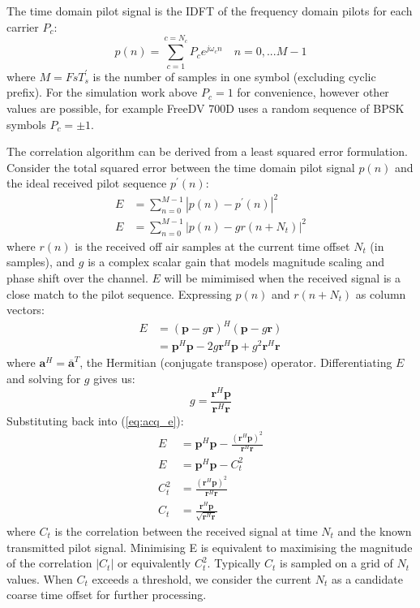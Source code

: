 \documentclass{article}
\begin{document}
The time domain pilot signal is the IDFT of the frequency domain pilots for each carrier $P_c$:
\begin{equation}
\label{eq:pilot_time}
p(n) = \sum^{c=N_c}_{c=1} P_c e^{j \omega_c n } \quad n=0,...M-1
\end{equation}
where $M=FsT^\prime_s$ is the number of samples in one symbol (excluding cyclic prefix). For the simulation work above $P_c=1$ for convenience, however other values are possible, for example FreeDV 700D uses a random sequence of BPSK symbols $P_c= \pm 1$.

The correlation algorithm can be derived from a least squared error formulation.  Consider the total squared error between the time domain pilot signal $p(n)$ and the ideal received pilot sequence $p^\prime(n)$:
\begin{equation}
\begin{split}
E &= \sum^{M-1}_{n=0} | p(n) - p^\prime(n) |^2 \\
E &= \sum^{M-1}_{n=0} | p(n) - gr(n+N_t)|^2
\end{split}
\end{equation}
where $r(n)$ is the received off air samples at the current time offset $N_{t}$  (in samples), and $g$ is a complex scalar gain that models magnitude scaling and phase shift over the channel.  $E$ will be mimimised when the received signal is a close match to the pilot sequence. Expressing $p(n)$ and $r(n+N_t)$ as column vectors:
\begin{equation}
\label{eq:acq_e}
\begin{split}
E &= (\bm{p}-g\bm{r})^H (\bm{p}-g\bm{r}) \\
  &= \bm{p}^H\bm{p} - 2g\bm{r}^H \bm{p} + g^2\bm{r}^H\bm{r}
\end{split}
\end{equation}
where $\bm{a}^H = \bm{\overline{a}}^T$, the Hermitian (conjugate transpose) operator. Differentiating $E$ and solving for $g$ gives us:
\begin{equation}
g = \frac{\bm{r}^H \bm{p}}{\bm{r}^H\bm{r}}
\end{equation}
Substituting back into (\ref{eq:acq_e}):
\begin{equation}
\label{eq:acq_corr}
\begin{split}
E &= \bm{p}^H\bm{p} - \frac{(\bm{r}^H \bm{p})^2}{\bm{r}^H\bm{r}} \\
E &= \bm{p}^H\bm{p} - C^2_t \\
C^2_t &= \frac{(\bm{r}^H \bm{p})^2}{\bm{r}^H\bm{r}} \\
C_t &= \frac{\bm{r}^H \bm{p}}{\sqrt{\bm{r}^H\bm{r}}}
\end{split}
\end{equation}
where $C_t$ is the correlation between the received signal at time $N_t$ and the known transmitted pilot signal. Minimising E is equivalent to maximising the magnitude of the correlation $|C_t|$ or equivalently $C^2_t$. Typically $C_t$ is sampled on a grid of $N_t$ values.  When $C_t$ exceeds a threshold, we consider the current $N_t$ as a candidate coarse time offset for further processing.
\end{document}
